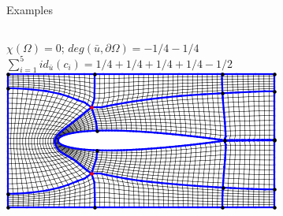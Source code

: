 \documentclass[compress,10pt,aspectratio=169]{beamer}
\begin{document}
\begin{frame}{Examples}
\begin{columns}
\begin{column}{0.34\textwidth}
{    \scriptsize
    $\chi(\Omega)=0$; $deg(\bar{u}, \partial\Omega) = -1/4-1/4$\\\vspace{0.1cm}
    $\sum_{i=1}^{5} id_{\bar{u}}(c_i)=1/4+1/4+1/4+1/4-1/2$\\\vspace{0.1cm}\vspace{0.6cm}
    \includegraphics[scale=0.35]{images/4.png}}
\end{column}
\begin{column}{0.34\textwidth}
    \centering
\end{column}
\end{columns}
\end{frame}
\end{document}
